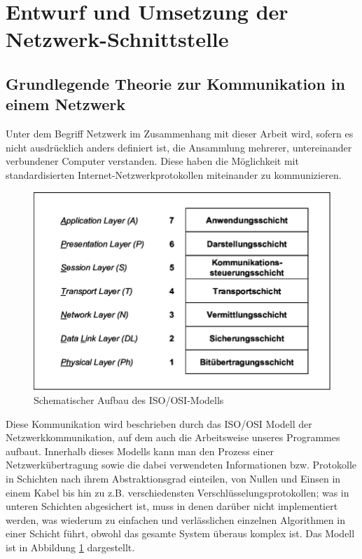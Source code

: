 
%
\section{Entwurf und Umsetzung der Netzwerk-Schnittstelle}
\subsection{Grundlegende Theorie zur Kommunikation in einem Netzwerk}
Unter dem Begriff Netzwerk im Zusammenhang mit dieser Arbeit wird, sofern es nicht ausdrücklich anders definiert ist, die Ansammlung mehrerer, untereinander verbundener Computer verstanden.
Diese haben die Möglichkeit mit standardisierten Internet-Netzwerkprotokollen miteinander zu kommunizieren.\\ 

\begin{figure}
\includegraphics[scale=1]{isoosi}
\caption{Schematischer Aufbau des ISO/OSI-Modells\protect\footnotemark}
\label{ISOOSI}
\end{figure}

Diese Kommunikation wird beschrieben durch das ISO/OSI Modell der Netzwerkkommunikation, auf dem auch die Arbeitsweise unseres Programmes aufbaut.
Innerhalb dieses Modells kann man den Prozess einer Netzwerkübertragung sowie die dabei verwendeten Informationen bzw. Protokolle in Schichten nach ihrem Abstraktionsgrad einteilen, von Nullen und Einsen in einem Kabel bis hin zu z.B. verschiedensten Verschlüsselungsprotokollen; was in unteren Schichten abgesichert ist, muss in denen darüber nicht implementiert werden, was wiederum zu einfachen und verlässlichen einzelnen Algorithmen in einer Schicht führt, obwohl das gesamte System überaus komplex ist. 
Das Modell ist in Abbildung \ref{ISOOSI} dargestellt.

